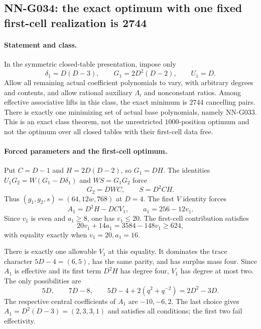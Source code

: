 \subsection{NN-G034: the exact optimum with one fixed first-cell realization is 2744}
\paragraph{Statement and class.}
In the symmetric closed-table presentation, impose only
\[
 \delta_1=D(D-3),\qquad G_1=2D^2(D-2),\qquad U_1=D.   \tag{G034.1}
\]
Allow all remaining actual coefficient polynomials to vary,
with arbitrary degrees and contents, and allow rational
auxiliary $\Lambda_i$ and nonconstant ratios.
Among effective associative lifts in this class, the exact
minimum is $2744$ cancelling pairs. There is exactly one
minimizing set of actual base polynomials, namely NN-G033.
This is an exact class theorem, not the unrestricted
$1000$-position optimum and not the optimum over all closed
tables with their first-cell data free.

\paragraph{Forced parameters and the first-cell optimum.}
Put $C=D-1$ and $H=2D(D-2)$, so $G_1=DH$.
The identities $U_1G_2=W(G_1-D\delta_1)$ and
$WS=G_1G_2$ force
\[
                  G_2=DWC,\qquad S=D^2CH.            \tag{G034.2}
\]
Thus $(g_1,g_2,s)=(64,12w,768)$ at $D=4$.
The first $V$ identity forces
\[
 A_1=D^2H-DCV_1,\qquad a_1=256-12v_1.
\]
Since $v_1$ is even and $a_1\ge8$, one has $v_1\le20$.
The first-cell contribution satisfies
\[
 20v_1+14a_1=3584-148v_1\ge624,
\]
with equality exactly when $v_1=20,a_1=16$.

There is exactly one allowable $V_1$ at this equality.
It dominates the trace character $5D-4=(6,5)$,
has the same parity, and has surplus mass four.
Since $A_1$ is effective and its first term $D^2H$
has degree four, $V_1$ has degree at most two.
The only possibilities are
\[
 5D,\qquad7D-8,\qquad5D-4+2(q^2+q^{-2})=2D^2-3D.
\]
The respective central coefficients of $A_1$ are
$-10,-6,2$. The last choice gives
$A_1=D^2(D-3)=(2,3,3,1)$ and satisfies all conditions;
the first two fail effectivity.

